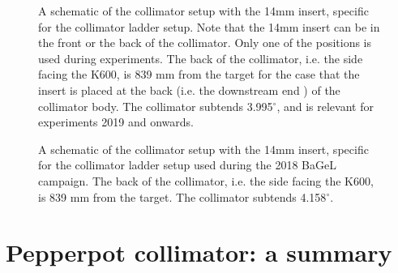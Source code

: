\documentclass[11pt]{report}
\begin{document}
\begin{figure}[!ht]
\centerline{\vspace{0cm}\hspace{0cm}
}
\centering
\caption{A schematic of the collimator setup with the 14mm insert, specific for the collimator ladder setup.
Note that the 14mm insert can be in the front or the back of the collimator. Only one of the positions
is used during experiments.
The back of the collimator, i.e. the side facing the K600, is 839 mm from the target 
for the case that the insert is placed at the back (i.e. the downstream end ) of the collimator body.
The collimator subtends 3.995$^{\circ}$, and is relevant for experiments 2019 and onwards.
}
\label{fig:collimatorladder-11mm}
\end{figure} 



\begin{figure}[!ht]
\centerline{\vspace{0cm}\hspace{0cm}
}
\centering
\caption{A schematic of the collimator setup with the 14mm insert, specific for the collimator ladder setup
used during the 2018 BaGeL campaign.
The back of the collimator, i.e. the side facing the K600, is 839 mm from the target. 
The collimator subtends 4.158$^{\circ}$.
}
\label{fig:collimatorladder-bagelcampaign}
\end{figure} 

\clearpage

\section{Pepperpot collimator: a summary}
\end{document}
